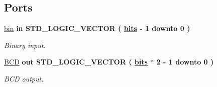 \subsection*{Ports}
 \begin{DoxyCompactItemize}
\item 
\hypertarget{classbin2bcd_ae61be7d0c2a4029f72fa99ab83ad96d2}{\hyperlink{classbin2bcd_ae61be7d0c2a4029f72fa99ab83ad96d2}{bin}  {\bfseries {\bfseries \textcolor{vhdlkeyword}{in}\textcolor{vhdlchar}{ }}} {\bfseries \textcolor{comment}{S\-T\-D\-\_\-\-L\-O\-G\-I\-C\-\_\-\-V\-E\-C\-T\-O\-R}\textcolor{vhdlchar}{ }\textcolor{vhdlchar}{(}\textcolor{vhdlchar}{ }\textcolor{vhdlchar}{ }{\bfseries \hyperlink{classbin2bcd_a03ce448558c2218cb8d7efccef340e15}{bits}} \textcolor{vhdlchar}{ }\textcolor{vhdlchar}{-\/}\textcolor{vhdlchar}{ } \textcolor{vhdldigit}{1} \textcolor{vhdlchar}{ }\textcolor{vhdlchar}{ }\textcolor{vhdlchar}{ }\textcolor{vhdlkeyword}{downto}\textcolor{vhdlchar}{ }\textcolor{vhdlchar}{ }\textcolor{vhdlchar}{ } \textcolor{vhdldigit}{0} \textcolor{vhdlchar}{ }\textcolor{vhdlchar}{)}\textcolor{vhdlchar}{ }} }\label{classbin2bcd_ae61be7d0c2a4029f72fa99ab83ad96d2}

\begin{DoxyCompactList}\small\item\em Binary input. \end{DoxyCompactList}\item 
\hypertarget{classbin2bcd_ac691a88cf4b7f8ed22a51c1b682e84aa}{\hyperlink{classbin2bcd_ac691a88cf4b7f8ed22a51c1b682e84aa}{B\-C\-D}  {\bfseries {\bfseries \textcolor{vhdlkeyword}{out}\textcolor{vhdlchar}{ }}} {\bfseries \textcolor{comment}{S\-T\-D\-\_\-\-L\-O\-G\-I\-C\-\_\-\-V\-E\-C\-T\-O\-R}\textcolor{vhdlchar}{ }\textcolor{vhdlchar}{(}\textcolor{vhdlchar}{ }\textcolor{vhdlchar}{ }{\bfseries \hyperlink{classbin2bcd_a03ce448558c2218cb8d7efccef340e15}{bits}} \textcolor{vhdlchar}{ }\textcolor{vhdlchar}{$\ast$}\textcolor{vhdlchar}{ } \textcolor{vhdldigit}{2} \textcolor{vhdlchar}{ }\textcolor{vhdlchar}{-\/}\textcolor{vhdlchar}{ } \textcolor{vhdldigit}{1} \textcolor{vhdlchar}{ }\textcolor{vhdlchar}{ }\textcolor{vhdlchar}{ }\textcolor{vhdlkeyword}{downto}\textcolor{vhdlchar}{ }\textcolor{vhdlchar}{ }\textcolor{vhdlchar}{ } \textcolor{vhdldigit}{0} \textcolor{vhdlchar}{ }\textcolor{vhdlchar}{)}\textcolor{vhdlchar}{ }} }\label{classbin2bcd_ac691a88cf4b7f8ed22a51c1b682e84aa}

\begin{DoxyCompactList}\small\item\em B\-C\-D output. \end{DoxyCompactList}\end{DoxyCompactItemize}



